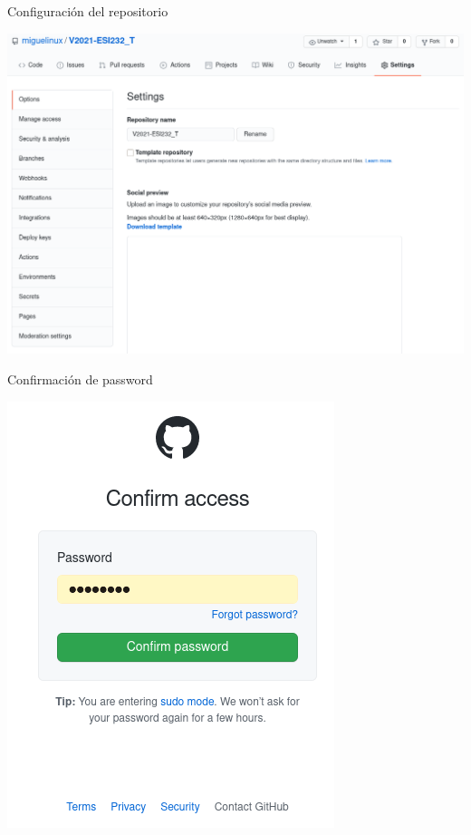 \begin{frame}[c]{Configuración del repositorio}
    \begin{center}
        \includegraphics[scale=0.3]{img/github-repo-settings.png}
    \end{center}
\end{frame}

\begin{frame}[c]{Confirmación de password}
    \begin{center}
        \includegraphics[scale=0.24]{img/github-ask-pwd.png}
    \end{center}
\end{frame}

